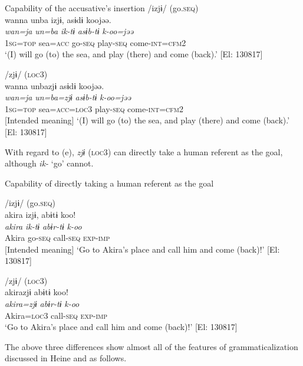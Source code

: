 \ea\label{ex:6-87}
  Capability of the accusative’s insertion
 \ea /izjɨ/ (go.\textsc{seq})\\
{\TM}
\glll  wanna  unba  izjɨ,  asɨdɨ  koojəə.\\
\textit{wan=ja}  \textit{un=ba}  \textit{ik-tɨ}  \textit{asɨb-tɨ}  \textit{k-oo=jəə}\\
1\textsc{sg}=\textsc{top}  sea=\textsc{acc}  go-\textsc{seq}  play-\textsc{seq}  come-\textsc{int}=\textsc{cfm}2\\
\glt ‘(I) will go (to) the sea, and play (there) and come (back).’ [El: 130817]

\ex /zjɨ/ (\textsc{loc3})\\
{\TM}
\glll  *wanna  unbazjɨ  asɨdɨ  koojəə.\\
\textit{wan=ja}  \textit{un=ba=zjɨ}  \textit{asɨb-tɨ}  \textit{k-oo=jəə}\\
1\textsc{sg}=\textsc{top}  sea=\textsc{acc}=\textsc{loc3}  play-\textsc{seq}  come-\textsc{int}=\textsc{cfm}2\\
{}      [Intended meaning] ‘(I) will go (to) the sea, and play (there) and come (back).’ [El: 130817]
\z
\z

With regard to (e), \textit{zjɨ} (\textsc{loc3}) can directly take a human referent as the goal, although \textit{ik-} ‘go’ cannot.

\ea\label{ex:6-88}
  Capability of directly taking a human referent as the goal

 \ea /izjɨ/ (go.\textsc{seq})\\
{\TM}
\glll  *akira  izjɨ,  abɨtɨ  koo!\\
\textit{akira}  \textit{ik-tɨ}  \textit{abɨr-tɨ}  \textit{k-oo}\\
Akira  go-\textsc{seq}  call-\textsc{seq}  \textsc{exp}-\textsc{imp}\\
{}       [Intended meaning] ‘Go to Akira’s place and call him and come (back)!’ [El: 130817]

\ex /zjɨ/ (\textsc{loc3})\\
{\TM}
\glll  akirazjɨ  abɨtɨ  koo!\\
\textit{akira=zjɨ}  \textit{abɨr-tɨ}  \textit{k-oo}\\
Akira=\textsc{loc3}  call-\textsc{seq}  \textsc{exp}-\textsc{imp}\\
 \glt ‘Go to Akira’s place and call him and come (back)!’ [El: 130817]
\z
\z

The above three differences show almost all of the features of grammaticalization discussed in Heine and \citet[2]{Kuteva2002} as follows.

